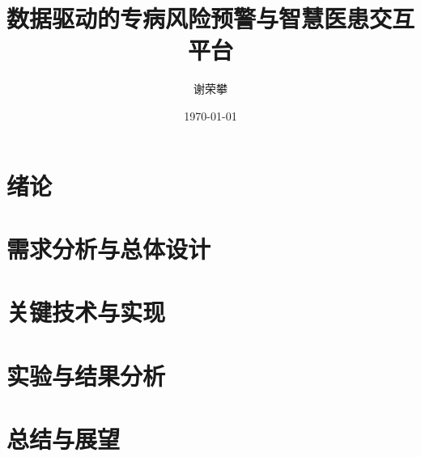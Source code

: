 \documentclass[12pt,a4paper]{ctexrep}
\title{数据驱动的专病风险预警与智慧医患交互平台}
\author{谢荣攀}
\date{\today}
\begin{document}
\maketitle
\tableofcontents
\chapter{绪论}

\chapter{需求分析与总体设计}

\chapter{关键技术与实现}

\chapter{实验与结果分析}

\chapter{总结与展望}

\end{document}

